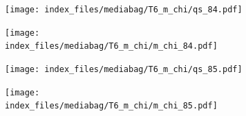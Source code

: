 \documentclass[
  11pt,
  letterpaper,
]{scrreprt}
\begin{document}
\begin{figure}

\begin{minipage}{0.50\linewidth}

\begin{figure}[H]

{\centering \texttt{[image: index\_files/mediabag/T6\_m\_chi/qs\_84.pdf]}

}


\end{figure}%

\end{minipage}%
%
\begin{minipage}{0.50\linewidth}

\begin{figure}[H]

{\centering \texttt{[image: index\_files/mediabag/T6\_m\_chi/m\_chi\_84.pdf]}

}


\end{figure}%

\end{minipage}%

\end{figure}%

\begin{figure}

\begin{minipage}{0.50\linewidth}

\begin{figure}[H]

{\centering \texttt{[image: index\_files/mediabag/T6\_m\_chi/qs\_85.pdf]}

}


\end{figure}%

\end{minipage}%
%
\begin{minipage}{0.50\linewidth}

\begin{figure}[H]

{\centering \texttt{[image: index\_files/mediabag/T6\_m\_chi/m\_chi\_85.pdf]}

}


\end{figure}%

\end{minipage}%

\end{figure}%
\end{document}
